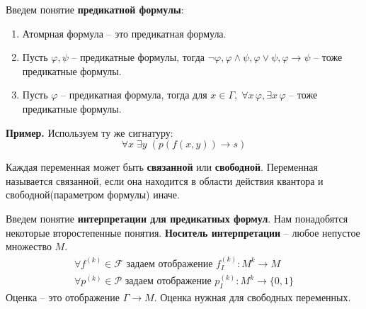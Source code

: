 \begin{conj}
    Введем понятие \textbf{предикатной формулы}:
    \begin{enumerate}
        \item Атомрная формула -- это предикатная формула.
        \item Пусть $\varphi, \psi$ -- предикатные формулы, тогда $\lnot \varphi, \varphi \land \psi, \varphi \lor \psi, \varphi \to \psi$ -- тоже предикатные формулы. 
        \item Пусть $\varphi$ -- предикатная формула, тогда для $x \in \Gamma, \; \forall x \, \varphi, \exists x \, \varphi$ -- тоже предикатные формулы.  
    \end{enumerate} 
\end{conj}

\textbf{Пример.} Используем ту же сигнатуру: \[ \forall x \; \exists y \; (p(f(x, y)) \to s) \]

\vspace{3mm}

\begin{conj}
    Каждая переменная может быть \textbf{связанной} или \textbf{свободной}. Переменная называется связанной, если она находится в области действия квантора и свободной(параметром формулы) иначе.
\end{conj}

\begin{conj}
    Введем понятие \textbf{интерпретации для предикатных формул}. Нам понадобятся некоторые 
    второстепенные понятия. 
    \textbf{Носитель интерпретации} -- любое непустое множество $M$.
    \begin{gather*}
        \forall f^{(k)} \in \mathcal{F} \text{ задаем отображение } f^{(k)}_I: M^k \longrightarrow M \\
        \forall p^{(k)} \in \mathcal{P} \text{ задаем отображение } p^{(k)}_I: M^k \longrightarrow \{0, 1\}
    \end{gather*}
    Оценка -- это отображение $\Gamma \longrightarrow M$. Оценка нужная для свободных переменных.
\end{conj}

